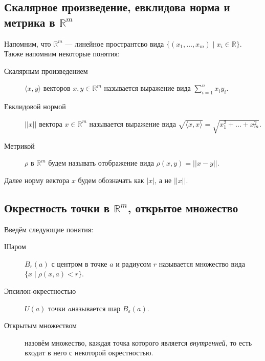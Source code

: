 \subsection{Скалярное произведение, евклидова норма и метрика в \(\mathbb{R}^m\)}

\begin{definition}
	Напомним, что \(\mathbb{R}^m\) --- линейное пространтсво вида \linebreak \(\{(x_1, \ldots, x_m) \mid x_i \in \mathbb{R}\}\). Также напомним некоторые понятия:
	\begin{description}
		\item[Скалярным произведением] \(\langle x, y \rangle\) векторов \(x, y \in \mathbb{R}^m\) называется выражение вида \( \sum\limits_{i=1}^n x_i y_i\).
		\item[Евклидовой нормой] \(||x||\) вектора \(x \in \mathbb{R}^m\) называется выражение вида \linebreak \(\sqrt{\langle x, x \rangle} = \sqrt{x_1^2 + \ldots + x_m^2}\).
		\item[Метрикой] \(\rho\) в \(\mathbb{R}^m\) будем называть отображение вида \(\rho(x, y) = || x - y||\). 
	\end{description}
\end{definition}

\begin{remark}
	Далее норму вектора \(x\) будем обозначать как  \(|x|\), а не \(||x||\).
\end{remark}

\subsection{Окрестность точки в \(\mathbb{R}^m\), открытое множество}

\begin{definition}
	Введём следующие понятия:
	\begin{description}
		\item[Шаром] \(B_r (a)\) с центром в точке \(a\) и радиусом \(r\) называется множество вида \(\{x \mid \rho(x, a) < r\}\).
		\item[Эпсилон-окрестностью] \(U(a)\) точки \(a\)называется шар \(B_\varepsilon (a)\).
		\item[Открытым множеством] назовём множество, каждая точка которого является \textit{внутренней}, то есть входит в него с некоторой окрестностью.
	\end{description}
\end{definition}

